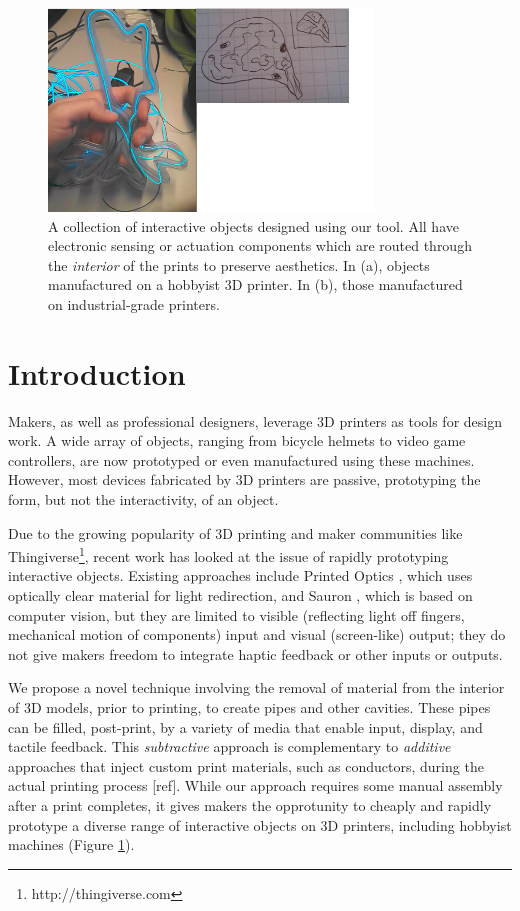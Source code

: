 \begin{figure}[h]
\centering
    \includegraphics[width=3.4in]{figures/placeholder/teaser.png}
\caption{A collection of interactive objects designed using our tool.  All have electronic sensing or actuation components which are routed through the \emph{interior} of the prints to preserve aesthetics.  In (a), objects manufactured on a hobbyist 3D printer.  In (b), those manufactured on industrial-grade printers.}
\label{fig:teaser}
\end{figure}

\section{Introduction}
Makers, as well as professional designers, leverage 3D printers as tools for design work.  A wide array of objects, ranging from bicycle helmets to video game controllers, are now prototyped or even manufactured using these machines.  However, most devices fabricated by 3D printers are passive, prototyping the form, but not the interactivity, of an object.  

Due to the growing popularity of 3D printing and maker communities like Thingiverse\footnote{http://thingiverse.com}, recent work has looked at the issue of rapidly prototyping interactive objects. Existing approaches include Printed Optics \cite{Willis-printedoptics}, which uses optically clear material for light redirection, and Sauron \cite{Savage-sauron}, which is based on computer vision, but they are limited to visible (reflecting light off fingers, mechanical motion of components) input and visual (screen-like) output; they do not give makers freedom to integrate haptic feedback or other inputs or outputs.

We propose a novel technique involving the removal of material from the interior of 3D models, prior to printing, to create pipes and other cavities.  These pipes can be filled, post-print, by a variety of media that enable input, display, and tactile feedback.  This {\em subtractive} approach is complementary to {\em additive} approaches that inject custom print materials, such as conductors, during the actual printing process [ref]. While our approach requires some manual assembly after a print completes, it gives makers the opprotunity to cheaply and rapidly prototype a diverse range of interactive objects on 3D printers, including hobbyist machines (Figure \ref{fig:teaser}).

